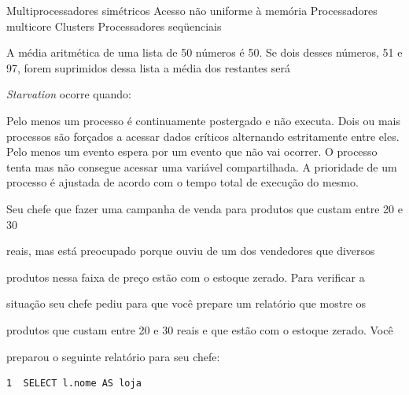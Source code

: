 \documentclass[12pt, addpoints]{exam}
\begin{document}
\begin{questions}
\begin{figure}[H]
\begin{center}
\end{center}

\end{figure}

\vspace{-1cm}
\begin{choices}
\choice Multiprocessadores simétricos
\choice Acesso não uniforme à memória
\choice Processadores multicore
\choice Clusters
\choice Processadores seqüenciais
\end{choices}

\question

A média aritmética de uma lista de 50 números é 50. Se dois desses números, 51 e 97, forem suprimidos dessa lista a média dos restantes será


\begin{choices}
\end{choices}

\question

\textit{Starvation} ocorre quando:
\begin{choices}
\choice Pelo menos um processo é continuamente postergado e não executa.
\choice Dois ou mais processos são forçados a acessar dados críticos alternando estritamente entre eles.
\choice Pelo menos um evento espera por um evento que não vai ocorrer.
\choice O processo tenta mas não consegue acessar uma variável compartilhada.
\choice A prioridade de um processo é ajustada de acordo com o tempo total de execução do mesmo.
\end{choices}

\question

Seu chefe que fazer uma campanha de venda para produtos que custam entre 20 e 30

reais, mas está preocupado porque ouviu de um dos vendedores que diversos

produtos nessa faixa de preço estão com o estoque zerado. Para verificar a

situação seu chefe pediu para que você prepare um relatório que mostre os

produtos que custam entre 20 e 30 reais e que estão com o estoque zerado. Você

preparou o seguinte relatório para seu chefe:

\begin{tcolorbox}

 \begin{verbatim}1  SELECT l.nome AS loja


\end{verbatim}
\end{tcolorbox}
\end{questions}
\end{document}
